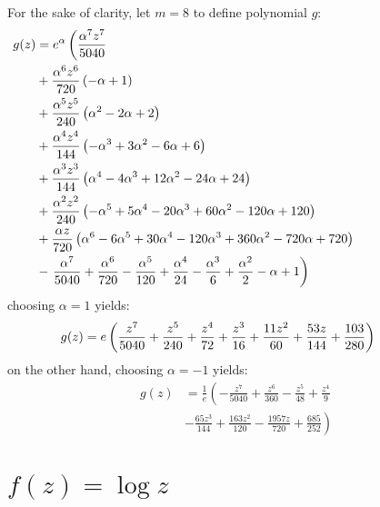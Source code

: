 For the sake of clarity, let $m=8$ to define polynomial $g$:
\begin{displaymath}
\hspace{-3cm}
\begin{split}
g{\left (z \right )} &= e^{\alpha}\left(\frac{\alpha^{7} z^{7}}{5040}\right. \\
&+ \frac{\alpha^{6} z^{6}}{720} \left(- \alpha + 1\right) \\
&+ \frac{\alpha^{5} z^{5}}{240} \left(\alpha^{2} - 2 \alpha + 2\right) \\
&+ \frac{\alpha^{4} z^{4}}{144} \left(- \alpha^{3} + 3 \alpha^{2} - 6 \alpha + 6\right) \\
&+ \frac{\alpha^{3} z^{3}}{144} \left(\alpha^{4} - 4 \alpha^{3} + 12 \alpha^{2} - 24 \alpha + 24\right) \\
&+ \frac{\alpha^{2} z^{2}}{240} \left(- \alpha^{5} + 5 \alpha^{4} - 20 \alpha^{3} + 60 \alpha^{2} - 120 \alpha + 120\right) \\
&+ \frac{\alpha z}{720} \left(\alpha^{6} - 6 \alpha^{5} + 30 \alpha^{4} - 120 \alpha^{3} + 360 \alpha^{2} - 720 \alpha + 720\right) \\
&- \left.\frac{\alpha^{7}}{5040} + \frac{\alpha^{6}}{720} - \frac{\alpha^{5}}{120} + \frac{\alpha^{4}}{24} - \frac{\alpha^{3}}{6} + \frac{\alpha^{2}}{2} -\alpha + 1\right) 
\end{split}
\end{displaymath}
choosing $\alpha=1$ yields:
\begin{displaymath}
\hspace{-1cm}
g{\left (z \right )} = e \left(\frac{z^{7}}{5040} + \frac{z^{5}}{240} + \frac{z^{4}}{72} + \frac{z^{3}}{16} + \frac{11 z^{2}}{60} + \frac{53 z}{144} + \frac{103}{280}\right)
\end{displaymath}
on the other hand, choosing $\alpha=-1$ yields:
\begin{displaymath}
\begin{split}
g{\left (z \right )} &= \frac{1}{e} \left( - \frac{z^{7}}{5040} + \frac{z^{6}}{360} - \frac{z^{5}}{48} + \frac{z^{4}}{9}\right. \\
                     &- \left.\frac{65 z^{3}}{144} + \frac{163 z^{2}}{120} - \frac{1957 z}{720} + \frac{685}{252}\right)
\end{split}
\end{displaymath}


\section{$f(z)=\log{z}$}


